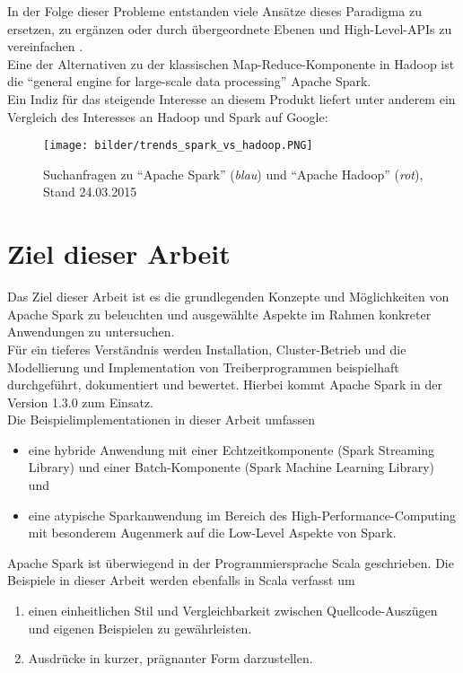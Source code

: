 In der Folge dieser Probleme entstanden viele Ansätze dieses Paradigma zu ersetzen, zu ergänzen oder durch übergeordnete Ebenen und High-Level-APIs zu vereinfachen \cite{Sin14}.\\

Eine der Alternativen zu der klassischen Map-Reduce-Komponente in Hadoop ist die "`general engine for large-scale data processing"' Apache Spark.\\

Ein Indiz für das steigende Interesse an diesem Produkt liefert unter anderem ein Vergleich des Interesses an Hadoop und Spark auf Google:\\

\begin{figure}[h]
\texttt{[image: bilder/trends\_spark\_vs\_hadoop.PNG]}
\caption[Google Trends]{Suchanfragen zu "`Apache Spark"' (\textit{blau}) und "`Apache Hadoop"' (\textit{rot}), Stand 24.03.2015 \cite{googletrends}}
\end{figure}

\section{Ziel dieser Arbeit}
Das Ziel dieser Arbeit ist es die grundlegenden Konzepte und Möglichkeiten von Apache Spark zu beleuchten und ausgewählte Aspekte im Rahmen konkreter Anwendungen zu untersuchen.\\

Für ein tieferes Verständnis werden Installation, Cluster-Betrieb und die Modellierung und Implementation von Treiberprogrammen beispielhaft durchgeführt, dokumentiert und bewertet. Hierbei kommt Apache Spark in der Version 1.3.0 zum Einsatz.\\

Die Beispielimplementationen in dieser Arbeit umfassen
\begin{itemize}
\item eine hybride Anwendung mit einer Echtzeitkomponente (Spark Streaming Library) und einer Batch-Komponente (Spark Machine Learning Library) und
\item eine atypische Sparkanwendung im Bereich des High-Performance-Computing mit besonderem Augenmerk auf die Low-Level Aspekte von Spark.
\end{itemize}

Apache Spark ist überwiegend in der Programmiersprache Scala geschrieben. Die Beispiele in dieser Arbeit werden ebenfalls in Scala verfasst um
\begin{enumerate}
	\item einen einheitlichen Stil und Vergleichbarkeit zwischen Quellcode-Auszügen und eigenen Beispielen zu gewährleisten.
	\item Ausdrücke in kurzer, prägnanter Form darzustellen.
\end{enumerate}
